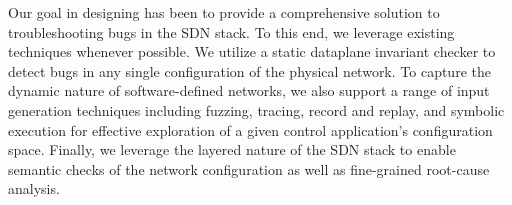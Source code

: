 Our goal in designing \projectname{} has been to provide a comprehensive solution to
troubleshooting bugs in the SDN stack. To this end, we
leverage existing techniques whenever possible. We utilize a static dataplane invariant
checker \cite{anteater} to detect bugs in any single configuration of the
physical network. To capture the dynamic nature of software-defined networks,
we also support a range of input generation techniques including fuzzing, tracing, record and
replay, and symbolic execution for effective exploration of a given control
application's configuration space. Finally, we leverage the layered nature of the
SDN stack to enable semantic checks of the network configuration  as
well as fine-grained root-cause analysis.


%
%
%
%
%

